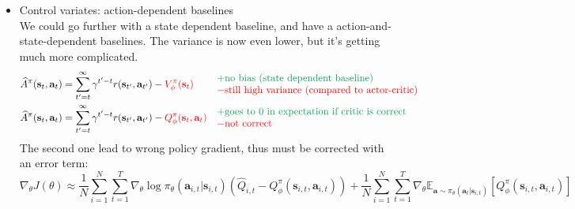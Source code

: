 \begin{itemize}
	\item Control variates: action-dependent baselines \cite{gu2016q}\\
	We could go further with a state dependent baseline, and have a action-and-state-dependent baselines. The variance is now even lower, but it's getting much more complicated.
	\begin{align*}
		&\widehat{A}^\pi(\textbf{s}_t, \textbf{a}_t) = \sum_{t' = t}^\infty \gamma^{t'-t} r(\textbf{s}_{t'}, \textbf{a}_{t'}) - {\color{red} V_\phi^\pi(\textbf{s}_{t})} && \begin{matrix*}[l]
			\color{Green} + \text{no bias (state dependent baseline)}\\
			\color{red} - \text{still high variance (compared to actor-critic)}
		\end{matrix*}\\
		&\widehat{A}^\pi(\textbf{s}_t, \textbf{a}_t) = \sum_{t' = t}^\infty \gamma^{t'-t} r(\textbf{s}_{t'}, \textbf{a}_{t'}) - {\color{red} Q_\phi^\pi(\textbf{s}_{t}, \textbf{a}_{t})} && \begin{matrix*}[l]
			\color{Green} + \text{goes to 0 in expectation if critic is correct}\\
			\color{red} - \text{not correct}
		\end{matrix*}
	\end{align*}
	The second one lead to wrong policy gradient, thus must be corrected with an error term:
	\begin{equation}
		\nabla_\theta J(\theta) \approx \frac{1}{N} \sum_{i=1}^N \sum_{t=1}^T \nabla_\theta\log\pi_{\theta}(\textbf{a}_{i,t}|\textbf{s}_{i,t}) \left( \widehat{Q}_{i,t} - Q^\pi_\phi(\textbf{s}_{i,t}, \textbf{a}_{i,t}) \right) + \frac{1}{N} \sum_{i=1}^N \sum_{t=1}^T \nabla_\theta\mathbb{E}_{\textbf{a}\sim\pi_\theta(\textbf{a}_t | \textbf{s}_{i,t})}[Q^\pi_\phi(\textbf{s}_{i,t}, \textbf{a}_{i,t})]
	\end{equation}
	

\end{itemize}

